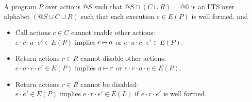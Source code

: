 \begin{definition}\label{def:programs}
A program $P$
over actions $@S$ such that $@S \cap (C \cup R) = @0$ is an LTS over alphabet
$(@S \cup C \cup R)$ such that each execution $e \in E(P)$ is well formed, and
\begin{itemize}

	\item Call actions $c \in C$ cannot enable other actions: \\
  $e \cdot c \cdot a \cdot e' \in E(P)$ implies
  $c \match a$ or $e \cdot a \cdot c \cdot e' \in E(P)$.

  \item Return actions $r \in R$ cannot disable other actions: \\
  $e \cdot a \cdot r \cdot e' \in E(P)$ implies
  $a \match r$ or $e \cdot r \cdot a \cdot e \in E(P)$.

  \item Return actions $r \in R$ cannot be disabled: \\
  $e \cdot e' \in E(P)$ implies $e \cdot r \cdot e' \in E(L)$
  if $e \cdot r \cdot e'$ is well formed.

\end{itemize}
\end{definition}



